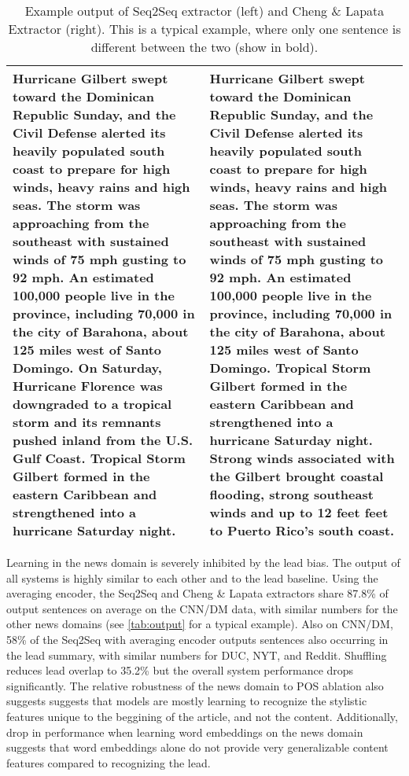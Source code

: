 
\begin{table*}
\centering
  \begin{tabular}{p{20em} p{20em}}
\toprule
Hurricane Gilbert swept toward the Dominican Republic Sunday, and the 
   Civil Defense alerted its heavily populated south coast to prepare 
   for high winds, heavy rains and high seas.                         
The storm was approaching from the southeast with sustained winds of  
   75 mph gusting to 92 mph.                                          
An estimated 100,000 people live in the province, including 70,000 in 
   the city of Barahona, about 125 miles west of Santo Domingo.       
\textbf{On Saturday, Hurricane Florence was downgraded to a tropical storm and
   its remnants pushed inland from the U.S. Gulf Coast.}               
Tropical Storm Gilbert formed in the eastern Caribbean and            
   strengthened into a hurricane Saturday night.  
&
Hurricane Gilbert swept toward the Dominican Republic Sunday, and the 
   Civil Defense alerted its heavily populated south coast to prepare 
   for high winds, heavy rains and high seas.                         
The storm was approaching from the southeast with sustained winds of  
   75 mph gusting to 92 mph.                                          
An estimated 100,000 people live in the province, including 70,000 in 
   the city of Barahona, about 125 miles west of Santo Domingo.       
Tropical Storm Gilbert formed in the eastern Caribbean and            
   strengthened into a hurricane Saturday night.                      
\textbf{Strong winds associated with the Gilbert brought coastal flooding,    
   strong southeast winds and up to 12 feet feet to Puerto Rico's     
   south coast.}   \\
\bottomrule
\end{tabular}
\caption{Example output of Seq2Seq extractor (left) and Cheng 
\& Lapata Extractor (right). This is a typical example, where only one
 sentence is different between the two (show in bold). }
\label{tab:output}
\end{table*}

Learning in the news domain is severely inhibited by the lead bias. 
The output of all systems is highly similar to each other and to the lead 
baseline. Using the averaging encoder, the Seq2Seq and Cheng \& Lapata
extractors share 87.8\% of output sentences on average on the CNN/DM data,
with similar numbers for the other news domains (see \autoref{tab:output}
for a typical example).  
Also on CNN/DM, 58\% of the Seq2Seq with averaging encoder outputs sentences also occurring
in the lead summary, with similar numbers for DUC, NYT, and Reddit. Shuffling
reduces lead overlap to 35.2\% but the overall system performance drops
    significantly.
    The relative robustness of the news domain to POS ablation also suggests
    suggests that models are mostly learning to recognize the stylistic 
    features unique to the beggining of the article, and not the content.
    Additionally, drop in performance when learning word embeddings on 
    the news domain suggests that word embeddings alone do not provide 
    very generalizable content features compared to recognizing the lead.

